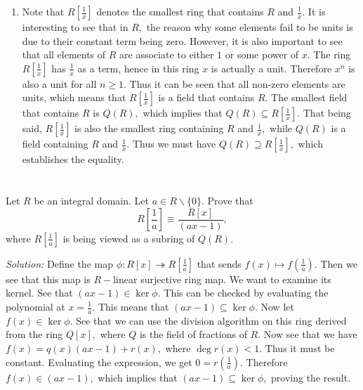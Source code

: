 \documentclass{article}
\begin{document}
\begin{enumerate}
	\item Note that $R[\frac{1}{x}]$ denotes the smallest ring that contains $R$ and $\frac{1}{x}$. It is interesting to see that in $R,$ the reason why 
	some elements fail to be units is due to their constant term being zero. However, it is also important to see that all elements of $R$ are associate to
	either $1$ or some power of $x.$ The ring $R\left[\frac{1}{x}\right]$ has $\frac{1}{x}$ as a term, hence in this ring $x$ is actually a unit. Therefore $x^n$ is also 
	a unit for all $n\geq 1.$ Thus it can be seen that all non-zero elements are units, which means that $R[\frac{1}{x}]$ is a field that contains $R.$ The smallest field 
	that contains $R$ is $Q(R),$ which implies that $Q(R) \subseteq R\left[\frac{1}{x}\right].$ %
	That being said, $R\left[ \frac{1}{x}\right]$ is also the smallest ring containing $R$ and $\frac{1}{x},$ while $Q(R)$ is a field containing $R$ and $\frac{1}{x}.$
	Thus we must have $Q(R) \supseteq R\left[ \frac{1}{x} \right],$ which establishes the equality.   
 	
	
\end{enumerate}
\section{} %

\section{} %
Let $R$ be an integral domain. Let $a \in R\backslash \{0\}.$
Prove that $$ R\left[\frac{1}{a}\right]\equiv \frac{R[x]}{(ax-1)},$$ where $R[\frac{1}{a}]$ is being viewed as a subring of $Q(R).$

\emph{Solution:} Define the map $\phi: R[x] \twoheadrightarrow R\left[ \frac{1}{a}\right]$ that sends $f(x) \mapsto f\left(\frac{1}{a}\right).$
Then we see that this map is $R-$linear surjective ring map. We want to examine its kernel. See that $(ax-1) \in \ker \phi.$ This can be checked by 
evaluating the polynomial at $x=\frac{1}{a}.$ This means that $(ax-1) \subseteq \ker \phi.$ Now let $f(x)\in \ker \phi.$ See that we can use the division
algorithm on this ring derived from the ring $Q[x],$ where $Q$ is the field of fractions of $R.$ Now see that we have $f(x)=q(x)(ax-1)+r(x),$ 
where $\deg r(x)<1.$ Thus it must be constant. Evaluating the expression, we get $0=r\left(\frac{1}{a}\right).$ Therefore $f(x) \in (ax-1),$ which implies that 
$(ax-1) \subseteq \ker \phi,$ proving the result.   
\end{document}
